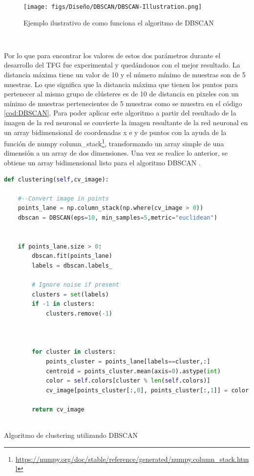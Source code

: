 \begin{figure} [H]
  \begin{center}
    \texttt{[image: figs/Diseño/DBSCAN/DBSCAN-Illustration.png]}
  \end{center}
  \caption{Ejemplo ilustrativo de como funciona el algoritmo de DBSCAN \cite{DBSCAN}}
  \label{fig:Ejemplo_DBSCAN}
\end{figure}\

Por lo que para encontrar los valores de estos dos parámetros durante el desarrollo del TFG fue experimental y quedándonos con el mejor resultado. La distancia máxima tiene un valor de 10 
y el número mínimo de muestras son de 5 muestras. Lo que significa que la distancia máxima que tienen los puntos para pertenecer al mismo grupo de clústeres es de 10 de distancia en pixeles
con un mínimo de muestras pertenecientes de 5 muestras como se muestra en el código \ref{cod:DBSCAN}. Para poder aplicar este algoritmo a partir del resultado de la imagen de la red neuronal se convierte la imagen resultante
de la red neuronal en un array bidimensional de coordenadas x e y de puntos con la ayuda de la función de numpy column\_stack\footnote{\url{https://numpy.org/doc/stable/reference/generated/numpy.column_stack.html}}, 
transformando un array simple de una dimensión a un array de dos dimensiones. Una vez se realice lo anterior, se obtiene un array bidimensional listo para el algoritmo DBSCAN .\newline


\begin{code}[h]
  \begin{lstlisting}[language=Python]
    def clustering(self,cv_image):

    #--Convert image in points
    points_lane = np.column_stack(np.where(cv_image > 0))
    dbscan = DBSCAN(eps=10, min_samples=5,metric="euclidean")
    

    if points_lane.size > 0:
        dbscan.fit(points_lane)
        labels = dbscan.labels_

        # Ignore noise if present
        clusters = set(labels)
        if -1 in clusters:
            clusters.remove(-1)
      
      
            
        for cluster in clusters:
            points_cluster = points_lane[labels==cluster,:]
            centroid = points_cluster.mean(axis=0).astype(int)
            color = self.colors[cluster % len(self.colors)]
            cv_image[points_cluster[:,0], points_cluster[:,1]] = color

        return cv_image
  
  \end{lstlisting}
  \caption[Algoritmo de custering utilizando DBSCAN]{Algoritmo de clustering utilizando DBSCAN}
  \label{cod:DBSCAN}
  \end{code}  
  

